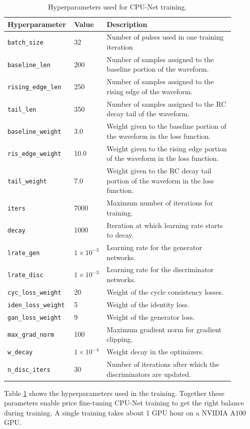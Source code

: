 \label{chap:cpu-net_result}


\begin{table}[ht!]
\centering
\renewcommand{\arraystretch}{1.5} %
\setlength{\tabcolsep}{4pt} %
\begin{tabular}{|p{0.23\linewidth}|p{0.12\linewidth}|p{0.55\linewidth}|}
\hline
\textbf{Hyperparameter}       & \textbf{Value} & \textbf{Description} \\ \hline
\texttt{batch\_size}          & 32             & Number of pulses used in one training iteration \\ \hline
\texttt{baseline\_len}        & 200            & Number of samples assigned to the baseline portion of the waveform. \\ \hline
\texttt{rising\_edge\_len}    & 250            & Number of samples assigned to the rising edge of the waveform. \\ \hline
\texttt{tail\_len}            & 350            & Number of samples assigned to the RC decay tail of the waveform. \\ \hline
\texttt{baseline\_weight}     & 3.0            & Weight given to the baseline portion of the waveform in the loss function. \\ \hline
\texttt{ris\_edge\_weight}    & 10.0           & Weight given to the rising edge portion of the waveform in the loss function. \\ \hline
\texttt{tail\_weight}         & 7.0            & Weight given to the RC decay tail portion of the waveform in the loss function. \\ \hline
\texttt{iters}                & 7000           & Maximum number of iterations for training. \\ \hline
\texttt{decay}                & 1000           & Iteration at which learning rate starts to decay. \\ \hline
\texttt{lrate\_gen}           & $1 \times 10^{-3}$ & Learning rate for the generator networks. \\ \hline
\texttt{lrate\_disc}          & $1 \times 10^{-3}$ & Learning rate for the discriminator networks. \\ \hline
\texttt{cyc\_loss\_weight}    & 20             & Weight of the cycle consistency losses.  \\ \hline
\texttt{iden\_loss\_weight}   & 5              & Weight of the identity loss. \\ \hline
\texttt{gan\_loss\_weight}    & 9              & Weight of the generator loss. \\ \hline
\texttt{max\_grad\_norm}      & 100            & Maximum gradient norm for gradient clipping. \\ \hline
\texttt{w\_decay}             & $1 \times 10^{-4}$ & Weight decay in the optimizers. \\ \hline
\texttt{n\_disc\_iters}       & 30             & Number of iterations after which the discriminators are updated. \\ \hline
\end{tabular}
\caption{Hyperparameters used for CPU-Net training.}
\label{tab:hyperparameters}
\end{table}


Table \ref{tab:hyperparameters} shows the hyperparameters used in the training. Together these parameters enable price fine-tuning CPU-Net training to get the right balance during training. A single training takes about 1 GPU hour on a NVIDIA A100 GPU.